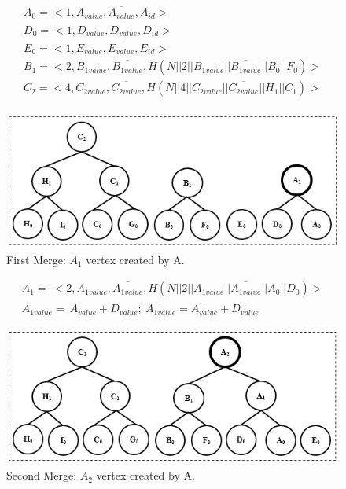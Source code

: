 		\begin{equation}
			\begin{array}{l}
				A_{0} = <1, A_{value}, \overline{A_{value}}, A_{id}>\\
				D_{0} = <1, D_{value}, \overline{D_{value}}, D_{id}>\\
				E_{0} = <1, E_{value}, \overline{E_{value}}, E_{id}>\\
				B_{1} = <2, B_{1value}, \overline{B_{1value}}, H(N || 2 || B_{1value} || \overline{B_{1value}} || B_{0} || F_{0})>\\
				C_{2} = <4, C_{2value}, \overline{C_{2value}}, H(N || 4 || C_{2value} || \overline{C_{2value}} || H_{1} || C_{1})>\\
			\end{array}
		\end{equation}
		\begin{figure}[h!]
			\centering
			\includegraphics{images/commitment-tree-example-2-shia.png}
			\caption{First Merge: $A_{1}$ vertex created by A.}
			\label{fig:commitment-tree-example-2-shia}
		\end{figure}
		\begin{equation}
			\begin{array}{l}
				A_{1} =\  < 2, A_{1value}, \overline{A_{1value}}, H(N || 2 || A_{1value}|| \overline{A_{1value}} || A_{0} || D_{0})>\\
				A_{1value} =\  A_{value} + D_{value};\ \overline{A_{1value}} = \overline{A_{value}} + \overline{D_{value}}
			\end{array}
		\end{equation}
		\begin{figure}[h!]
			\centering
			\includegraphics{images/commitment-tree-example-3-shia.png}
			\caption{Second Merge: $A_{2}$ vertex created by A.}
			\label{fig:commitment-tree-example-3-shia}
		\end{figure}
